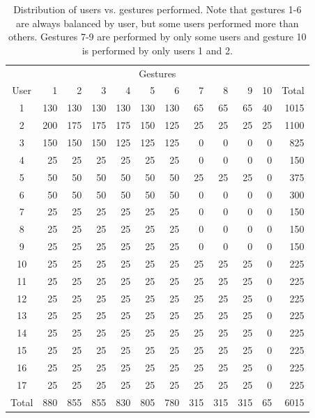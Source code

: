 \begin{table}[tbp]
	\centering
	\begin{tabular}{@{}crrrrrrrrrrr@{}}
		\toprule
		& \multicolumn{10}{c}{Gestures}                      & \multicolumn{1}{l}{} \\ 
		User  & 1   & 2   & 3   & 4   & 5   & 6   & 7   & 8   & 9   & 10 & Total    \\ \midrule
		1     & 130 & 130 & 130 & 130 & 130 & 130 & 65  & 65  & 65  & 40 & 1015     \\
		2     & 200 & 175 & 175 & 175 & 150 & 125 & 25  & 25  & 25  & 25 & 1100     \\
		3     & 150 & 150 & 150 & 125 & 125 & 125 & 0   & 0   & 0   & 0  & 825      \\
		4     & 25  & 25  & 25  & 25  & 25  & 25  & 0   & 0   & 0   & 0  & 150      \\
		5     & 50  & 50  & 50  & 50  & 50  & 50  & 25  & 25  & 25  & 0  & 375      \\
		6     & 50  & 50  & 50  & 50  & 50  & 50  & 0   & 0   & 0   & 0  & 300      \\
		7     & 25  & 25  & 25  & 25  & 25  & 25  & 0   & 0   & 0   & 0  & 150      \\
		8     & 25  & 25  & 25  & 25  & 25  & 25  & 0   & 0   & 0   & 0  & 150      \\
		9     & 25  & 25  & 25  & 25  & 25  & 25  & 0   & 0   & 0   & 0  & 150      \\
		10    & 25  & 25  & 25  & 25  & 25  & 25  & 25  & 25  & 25  & 0  & 225      \\
		11    & 25  & 25  & 25  & 25  & 25  & 25  & 25  & 25  & 25  & 0  & 225      \\
		12    & 25  & 25  & 25  & 25  & 25  & 25  & 25  & 25  & 25  & 0  & 225      \\
		13    & 25  & 25  & 25  & 25  & 25  & 25  & 25  & 25  & 25  & 0  & 225      \\
		14    & 25  & 25  & 25  & 25  & 25  & 25  & 25  & 25  & 25  & 0  & 225      \\
		15    & 25  & 25  & 25  & 25  & 25  & 25  & 25  & 25  & 25  & 0  & 225      \\
		16    & 25  & 25  & 25  & 25  & 25  & 25  & 25  & 25  & 25  & 0  & 225      \\
		17    & 25  & 25  & 25  & 25  & 25  & 25  & 25  & 25  & 25  & 0  & 225      \\ \midrule
		Total & 880 & 855 & 855 & 830 & 805 & 780 & 315 & 315 & 315 & 65 & 6015     \\ \bottomrule
	\end{tabular}
	\caption{Distribution of users vs. gestures performed. Note that gestures 1-6 are always balanced by user, but some users performed more than others. Gestures 7-9 are performed by only some users and gesture 10 is performed by only users 1 and 2.}
\end{table}

